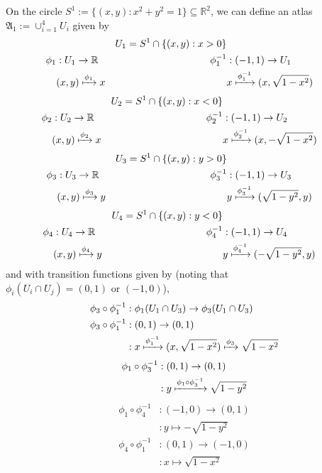 \documentclass[a4paper]{article}
\theoremstyle{definition} \newtheorem*{definition}{Definition}
\theoremstyle{definition} \newtheorem*{definitions}{Definitions}
\theoremstyle{plain} \newtheorem{theorem}{Theorem}[section]
\theoremstyle{plain} \newtheorem{proposition}[theorem]{Proposition}
\theoremstyle{plain} \newtheorem{corollary}[theorem]{Corollary}
\theoremstyle{plain} \newtheorem{lemma}[theorem]{Lemma}
\theoremstyle{plain} \newtheorem{example}[theorem]{Example}
\newcommand{\realnos}{\mathbb{R}}
\begin{document}
On the circle $S^1:=\{(x, y): x^2+y^2 = 1\}\subseteq \realnos^2$, we can define an atlas $\mathfrak{A}_1 :=\cup_{i=1}^4 U_i$ given by 
\begin{align*}
&& U_1 = S^1 \cap \{(x, y): x>0 \} \\
\phi_1 & : U_1\to \realnos &
\phi_1^{-1} & :(-1, 1)\to U_1 \\
& (x,y) \xmapsto{\phi_1} x 
& & x \xmapsto{\phi_1^{-1}} (x, \sqrt{1-x^2})
\end{align*}
\begin{align*}
&& U_2 = S^1 \cap \{(x, y): x<0 \} \\
\phi_2 & : U_2\to \realnos &
\phi_2^{-1} & :(-1, 1)\to U_2 \\
& (x,y) \xmapsto{\phi_2} x 
& & x \xmapsto{\phi_2^{-1}} (x, - \sqrt{1-x^2})
\end{align*}
\begin{align*}
&& U_3 = S^1 \cap \{(x, y): y>0 \} \\
\phi_3 & : U_3\to \realnos &
\phi_3^{-1} & :(-1, 1)\to U_3 \\
& (x,y) \xmapsto{\phi_3} y
& & y \xmapsto{\phi_3^{-1}} (\sqrt{1-y^2}, y)
\end{align*}
\begin{align*}
&& U_4 = S^1 \cap \{(x, y): y<0 \} \\
\phi_4 & : U_4\to \realnos &
\phi_4^{-1} & :(-1, 1)\to U_4 \\
& (x,y) \xmapsto{\phi_4} y
& & y \xmapsto{\phi_4^{-1}} (- \sqrt{1-y^2}, y)
\end{align*}
and with transition functions given by (noting that $\phi_i(U_i\cap U_j) = (0, 1) \text{ or } (-1, 0)$), 
\begin{align*}
\phi_3 \circ \phi_1^{-1} & :\phi_1(U_1\cap U_3)\to \phi_3(U_1 \cap U_3) \\
\phi_3 \circ \phi_1^{-1} & : (0,1) \to (0,1) \\
& : x \xmapsto{\phi_1^{-1}} (x, \sqrt{1-x^2}) \xmapsto{\phi_3} \sqrt{1-x^2}
\end{align*}
\begin{align*}
\phi_1 \circ \phi_3^{-1} & : (0,1) \to (0,1) \\
& : y \xmapsto{\phi_1 \circ \phi_3^{-1}}  \sqrt{1-y^2}
\end{align*}
\begin{align*}
\phi_1 \circ \phi_4^{-1} & : (-1,0) \to (0,1) \\
& : y \mapsto -\sqrt{1-y^2}
\end{align*}
\begin{align*}
\phi_4 \circ \phi_1^{-1} & : (0,1) \to (-1, 0) \\
& : x \mapsto \sqrt{1-x^2}
\end{align*}
\end{document}
